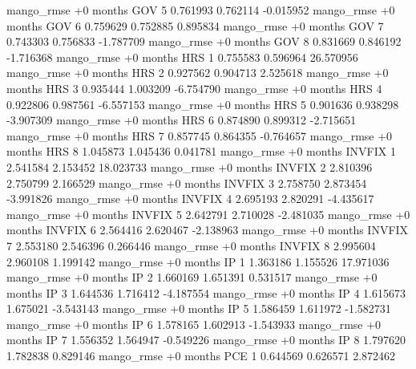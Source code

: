 mango_rmse +0 months      GOV                 5 0.761993       0.762114          -0.015952
mango_rmse +0 months      GOV                 6 0.759629       0.752885           0.895834
mango_rmse +0 months      GOV                 7 0.743303       0.756833          -1.787709
mango_rmse +0 months      GOV                 8 0.831669       0.846192          -1.716368
mango_rmse +0 months      HRS                 1 0.755583       0.596964          26.570956
mango_rmse +0 months      HRS                 2 0.927562       0.904713           2.525618
mango_rmse +0 months      HRS                 3 0.935444       1.003209          -6.754790
mango_rmse +0 months      HRS                 4 0.922806       0.987561          -6.557153
mango_rmse +0 months      HRS                 5 0.901636       0.938298          -3.907309
mango_rmse +0 months      HRS                 6 0.874890       0.899312          -2.715651
mango_rmse +0 months      HRS                 7 0.857745       0.864355          -0.764657
mango_rmse +0 months      HRS                 8 1.045873       1.045436           0.041781
mango_rmse +0 months   INVFIX                 1 2.541584       2.153452          18.023733
mango_rmse +0 months   INVFIX                 2 2.810396       2.750799           2.166529
mango_rmse +0 months   INVFIX                 3 2.758750       2.873454          -3.991826
mango_rmse +0 months   INVFIX                 4 2.695193       2.820291          -4.435617
mango_rmse +0 months   INVFIX                 5 2.642791       2.710028          -2.481035
mango_rmse +0 months   INVFIX                 6 2.564416       2.620467          -2.138963
mango_rmse +0 months   INVFIX                 7 2.553180       2.546396           0.266446
mango_rmse +0 months   INVFIX                 8 2.995604       2.960108           1.199142
mango_rmse +0 months       IP                 1 1.363186       1.155526          17.971036
mango_rmse +0 months       IP                 2 1.660169       1.651391           0.531517
mango_rmse +0 months       IP                 3 1.644536       1.716412          -4.187554
mango_rmse +0 months       IP                 4 1.615673       1.675021          -3.543143
mango_rmse +0 months       IP                 5 1.586459       1.611972          -1.582731
mango_rmse +0 months       IP                 6 1.578165       1.602913          -1.543933
mango_rmse +0 months       IP                 7 1.556352       1.564947          -0.549226
mango_rmse +0 months       IP                 8 1.797620       1.782838           0.829146
mango_rmse +0 months      PCE                 1 0.644569       0.626571           2.872462
